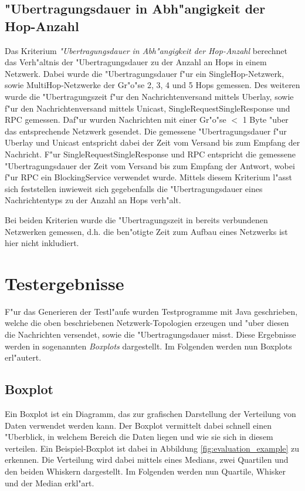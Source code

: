 \subsection{"Ubertragungsdauer in Abh"angigkeit der Hop-Anzahl}

Das Kriterium \emph{"Ubertragungsdauer in Abh"angigkeit der Hop-Anzahl} berechnet das Verh"altnis der "Uber\-tra\-gungs\-dauer zu der Anzahl an Hops in einem Netzwerk. Dabei wurde die "Uber\-tra\-gungs\-dauer f"ur ein SingleHop-Netzwerk, sowie MultiHop-Netzwerke der Gr"o"se 2, 3, 4 und 5 Hops gemessen. Des weiteren wurde die "Ubertragungszeit f"ur den Nachrichtenversand mittels Uberlay, sowie f"ur den Nachrichtenversand mittels Unicast, SingleRequestSingleResponse und RPC gemessen. Daf"ur wurden Nachrichten mit einer Gr"o"se $<$ 1 Byte "uber das entsprechende Netzwerk gesendet. Die gemessene "Uber\-tra\-gungs\-dauer f"ur Uberlay und Unicast entspricht dabei der Zeit vom Versand bis zum Empfang der Nachricht. F"ur SingleRequestSingleResponse und RPC entspricht die gemessene "Uber\-tra\-gungs\-dauer der Zeit vom Versand bis zum Empfang der Antwort, wobei f"ur RPC ein BlockingService verwendet wurde. Mittels diesem Kriterium l"asst sich feststellen inwieweit sich gegebenfalls die "Uber\-tra\-gungs\-dauer eines Nachrichtentyps zu der Anzahl an Hops verh"alt.  

Bei beiden Kriterien wurde die "Ubertragungszeit in bereits verbundenen Netzwerken gemessen, d.h. die ben"otigte Zeit zum Aufbau eines Netzwerks ist hier nicht inkludiert. 

\section{Testergebnisse}
F"ur das Generieren der Testl"aufe wurden Testprogramme mit Java geschrieben, welche die oben beschriebenen Netzwerk-Topologien erzeugen und "uber diesen die Nachrichten versendet, sowie die "Uber\-tra\-gungs\-dauer misst. Diese Ergebnisse werden in sogenannten \emph{Boxplots} dargestellt. Im Folgenden werden nun Boxplots erl"autert.

\subsection{Boxplot}
Ein Boxplot ist ein Diagramm, das zur grafischen Darstellung der Verteilung von Daten verwendet werden kann. Der Boxplot vermittelt dabei schnell einen "Uberblick, in welchem Bereich die Daten liegen und wie sie sich in diesem verteilen. Ein Beispiel-Boxplot ist dabei in Abbildung \ref{fig:evaluation_example} zu erkennen. Die Verteilung wird dabei mittels eines Medians, zwei Quartilen und den beiden Whiskern dargestellt. Im Folgenden werden nun Quartile, Whisker und der Median erkl"art.

